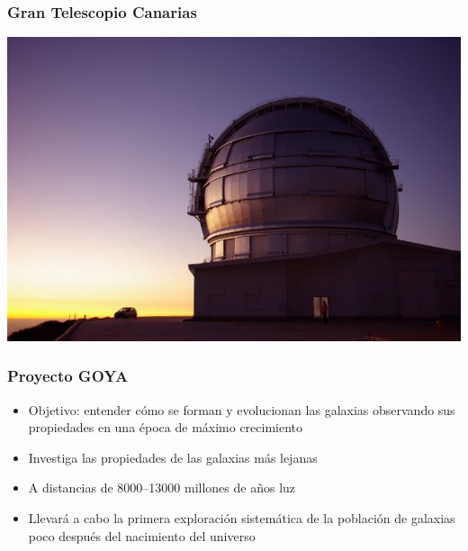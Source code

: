 \begin{frame}
    \frametitle{Gran Telescopio Canarias}
    \endblock{}
		\begin{center}
    \includegraphics[width=0.8\linewidth]{FIGURES/GTC}
		\end{center}
\end{frame}

\begin{frame}
    \frametitle{Proyecto GOYA}
    \begin{itemize}
		\item Objetivo: entender cómo se forman y evolucionan las galaxias observando sus propiedades en una época de máximo crecimiento
		\item Investiga las propiedades de las galaxias más lejanas
		\item A distancias de 8000--13000 millones de años luz
		\item Llevará a cabo la primera exploración sistemática de la población de galaxias poco después del nacimiento del universo
    \end{itemize}
    \endblock{}
\end{frame}

